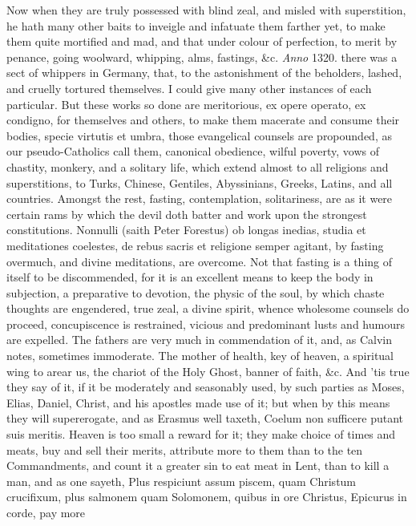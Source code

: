{Now when they are truly possessed with blind zeal, and misled with
superstition, he hath many other baits to inveigle and infatuate them
farther yet, to make them quite mortified and mad, and that under
colour of perfection, to merit by penance, going woolward, whipping,
alms, fastings, \&c. \emph{Anno} 1320. there was a sect of whippers in
Germany, that, to the astonishment of the beholders, lashed, and
cruelly tortured themselves. I could give many other instances of each
particular. But these works so done are meritorious, ex opere operato,
ex condigno, for themselves and others, to make them macerate and
consume their bodies, specie virtutis et umbra, those evangelical
counsels are propounded, as our pseudo-Catholics call them, canonical
obedience, wilful poverty, vows of chastity, monkery, and a
solitary life, which extend almost to all religions and superstitions,
to Turks, Chinese, Gentiles, Abyssinians, Greeks, Latins, and all
countries. Amongst the rest, fasting, contemplation, solitariness, are
as it were certain rams by which the devil doth batter and work upon
the strongest constitutions. Nonnulli (saith Peter Forestus) ob longas
inedias, studia et meditationes coelestes, de rebus sacris et religione
semper agitant, by fasting overmuch, and divine meditations, are
overcome. Not that fasting is a thing of itself to be discommended, for
it is an excellent means to keep the body in subjection, a preparative
to devotion, the physic of the soul, by which chaste thoughts are
engendered, true zeal, a divine spirit, whence wholesome counsels do
proceed, concupiscence is restrained, vicious and predominant lusts and
humours are expelled. The fathers are very much in commendation of it,
and, as Calvin notes, sometimes immoderate. The mother of health,
key of heaven, a spiritual wing to arear us, the chariot of the Holy
Ghost, banner of faith, \&c. And 'tis true they say of it, if it be
moderately and seasonably used, by such parties as Moses, Elias,
Daniel, Christ, and his apostles made use of it; but when by this
means they will supererogate, and as Erasmus well taxeth, Coelum
non sufficere putant suis meritis. Heaven is too small a reward for it;
they make choice of times and meats, buy and sell their merits,
attribute more to them than to the ten Commandments, and count it a
greater sin to eat meat in Lent, than to kill a man, and as one sayeth,
Plus respiciunt assum piscem, quam Christum crucifixum, plus salmonem
quam Solomonem, quibus in ore Christus, Epicurus in corde, pay more
}
